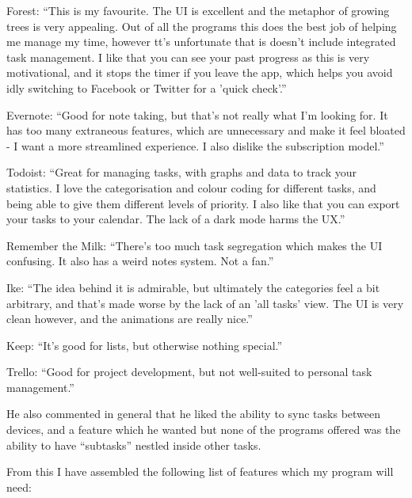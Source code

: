 \documentclass{article}
\begin{document}
\begin{description}
	\item Forest: ``This is my favourite. The UI is excellent and the metaphor of
	      growing trees is very appealing. Out of all the programs this does the best
	      job of helping me manage my time, however tt's unfortunate that is doesn't
	      include integrated task management. I like that you can see your past progress
	      as this is very motivational, and it stops the timer if you leave the app,
	      which helps you avoid idly switching to Facebook or Twitter for a 'quick
	      check'.''
	\item Evernote: ``Good for note taking, but that's not really what I'm looking
	      for. It has too many extraneous features, which are unnecessary and make it
	      feel bloated - I want a more streamlined experience. I also dislike the
	      subscription model.''
	\item Todoist: ``Great for managing tasks, with graphs and data to track your
	      statistics. I love the categorisation and colour coding for different tasks,
	      and being able to give them different levels of priority. I also like that you
	      can export your tasks to your calendar. The lack of a dark mode harms the
	      UX.''
	\item Remember the Milk: ``There's too much task segregation which makes the UI
	      confusing. It also has a weird notes system. Not a fan.''
	\item Ike: ``The idea behind it is admirable, but ultimately the categories feel
	      a bit arbitrary, and that's made worse by the lack of an 'all tasks' view. The
	      UI is very clean however, and the animations are really nice.''
	\item Keep: ``It's good for lists, but otherwise nothing special.''
	\item Trello: ``Good for project development, but not well-suited to personal
	      task management.''
\end{description}

He also commented in general that he liked the ability to sync tasks between
devices, and a feature which he wanted but none of the programs offered was the
ability to have ``subtasks'' nestled inside other tasks.

From this I have assembled the following list of features which my program will
need:
\end{document}
